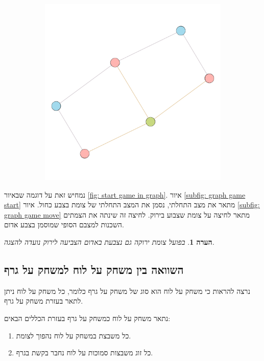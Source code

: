 \documentclass[12pt,leqno]{article}
\theoremstyle{theoremdd}
\newtheorem{comm}{הערה}
\begin{document}
\begin{figure}[ht]
\begin{subfigure}{.5\textwidth}
        \includegraphics[scale=0.7]{images/graph_press.png}
    \end{subfigure}%
\end{figure}

נמחיש זאת על דוגמה שבאיור
\ref{fig: start game in graph}.
איור 
\ref{subfig: graph game start}
מתאר את מצב התחלתי, נסמן את המצב התחלתי של צומת בצבע כחול.
איור
\ref{subfig: graph game move}
מתאר לחיצה על צומת שצבוע בירוק.
לחיצה זה שינתה את הצמתים השכנות למצבם הסופי שמוסמן בצבע אדום.
\begin{comm}
    בפועל צומת ירוקה גם נצבעת באדום הצביעה לירוק נועדה להצגה.
\end{comm}

\subsection{השוואה בין משחק על לוח למשחק על גרף}
נרצה להראות כי משחק על לוח הוא סוג של משחק על גרף
כלומר, כל משחק על לוח ניתן לתאר בעזרת משחק על גרף.

נתאר משחק על לוח כמשחק על גרף בעזרת הכללים הבאים:
\begin{enumerate}
    \item 
    כל משבצת במשחק על לוח נהפוך לצומת.
    \item 
    כל זוג משבצות סמוכות על לוח נחבר בקשת בגרף.
\end{enumerate}
\end{document}
